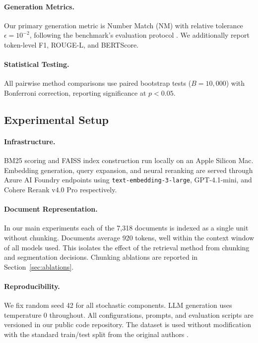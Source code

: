 \documentclass[11pt]{article}
\begin{document}
\paragraph{Generation Metrics.}
Our primary generation metric is Number Match (NM) with relative tolerance $\epsilon = 10^{-2}$, following the benchmark's evaluation protocol \cite{strich2026t2ragbench}. We additionally report token-level F1, ROUGE-L, and BERTScore.

\paragraph{Statistical Testing.}
All pairwise method comparisons use paired bootstrap tests ($B = 10{,}000$) with Bonferroni correction, reporting significance at $p < 0.05$.

\subsection{Experimental Setup}
\label{sec:setup}

\paragraph{Infrastructure.}
BM25 scoring and FAISS index construction run locally on an Apple Silicon Mac. Embedding generation, query expansion, and neural reranking are served through Azure AI Foundry endpoints using \texttt{text-embedding-3-large}, GPT-4.1-mini, and Cohere Rerank v4.0 Pro respectively.

\paragraph{Document Representation.}
In our main experiments each of the 7,318 documents is indexed as a single unit without chunking. Documents average 920 tokens, well within the context window of all models used. This isolates the effect of the retrieval method from chunking and segmentation decisions. Chunking ablations are reported in Section~\ref{sec:ablations}.

\paragraph{Reproducibility.}
We fix random seed 42 for all stochastic components. LLM generation uses temperature 0 throughout. All configurations, prompts, and evaluation scripts are versioned in our public code repository. The dataset is used without modification with the standard train/test split from the original authors \cite{strich2026t2ragbench}.
\end{document}
